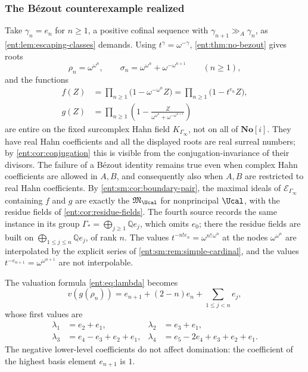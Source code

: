 \documentclass[11pt]{article}
\theoremstyle{plain}
\theoremstyle{plain}
\theoremstyle{plain}
\theoremstyle{definition}
\theoremstyle{definition}
\theoremstyle{definition}
\theoremstyle{definition}
\theoremstyle{remark}
\newcommand{\Q}{\mathbb Q}\newcommand{\Z}{\mathbb Z}\newcommand{\N}{\mathbb N}
\newcommand{\No}{\mathbf{No}}
\newcommand{\ggA}{\mathrel{\gg_{\!A}}}
\begin{document}
\subsubsection*{The B\'ezout counterexample realized}
Take $\gamma_n=e_n$ for $n\ge1$, a positive cofinal sequence with
$\gamma_{n+1}\ggA\gamma_n$, as \cref{ent:lem:escaping-classes} demands.
Using $t^\gamma=\omega^{-\gamma}$, \cref{ent:thm:no-bezout} gives roots
\begin{equation}\label{ent:eq:surreal-roots}
 \rho_n=\omega^{\omega^n},\qquad
 \sigma_n=\omega^{\omega^n}+\omega^{-\omega^{n+1}}
 \qquad(n\ge1),
\end{equation}
and the functions
\begin{align}
 f(Z)&=\prod_{n\ge1}\bigl(1-\omega^{-\omega^n}Z\bigr)
      =\prod_{n\ge1}\bigl(1-t^{e_n}Z\bigr),
      \label{ent:eq:f-explicit}\\
 g(Z)&=\prod_{n\ge1}\left(
 1-\frac{Z}{\omega^{\omega^n}+\omega^{-\omega^{n+1}}}\right)
\end{align}
are entire on the fixed surcomplex Hahn field $K_{\Gamma_\infty}$, not on all
of $\No[i]$. They have real Hahn coefficients and all the displayed roots are
real surreal numbers; by \cref{ent:cor:conjugation} this is visible from the
conjugation-invariance of their divisors. The failure of a B\'ezout identity
remains true even when complex Hahn coefficients are allowed in $A,B$, and
consequently also when $A,B$ are restricted to real Hahn coefficients. By
\cref{ent:sm:cor:boundary-pair}, the maximal ideals of
$\mathcal E_{\Gamma_\infty}$ containing $f$ and $g$ are exactly the
$\mathfrak M_\Ucal$ for nonprincipal $\Ucal$, with the residue fields of
\cref{ent:cor:residue-fields}. The fourth source records the same instance
in its group $\Gamma_*=\bigoplus_{j\ge1}\Q e_j$, which omits $e_0$; there
the residue fields are built on $\bigoplus_{1\le j\le n}\Q e_j$, of rank $n$.
The values $t^{-n!e_n}=\omega^{n!\,\omega^n}$ at the nodes $\omega^{\omega^n}$
are interpolated by the explicit series of
\cref{ent:sm:rem:simple-cardinal}, and the values
$t^{-e_{n+1}}=\omega^{\omega^{n+1}}$ are not interpolable.

The valuation formula \eqref{ent:eq:lambda} becomes
\[
 v(g(\rho_n))=e_{n+1}+(2-n)e_n+\sum_{1\le j<n}e_j,
\]
whose first values are
\begin{align*}
 \lambda_1&=e_2+e_1, & \lambda_2&=e_3+e_1,\\
 \lambda_3&=e_4-e_3+e_2+e_1,
 &\lambda_4&=e_5-2e_4+e_3+e_2+e_1.
\end{align*}
The negative lower-level coefficients do not affect domination: the
coefficient of the highest basis element $e_{n+1}$ is $1$.
\end{document}
